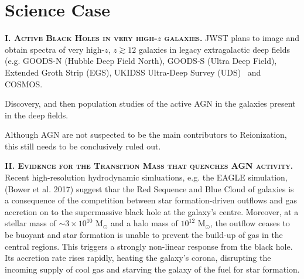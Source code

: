 \documentclass[11pt,epsf]{article}
\begin{document}
\newpage
\medskip
\medskip

\section*{Science Case}

\smallskip
\smallskip
\noindent
\textbf{\textsc{I. Active Black Holes in very high-$z$ galaxies.}} 
JWST plans to image and obtain spectra of very high-$z$, $z\gtrsim12$
galaxies in legacy extragalactic deep fields (e.g. GOODS-N (Hubble
Deep Field North), GOODS‐S (Ultra Deep Field), Extended Groth Strip
(EGS), UKIDSS Ultra-Deep Survey (UDS) \ and COSMOS.

\noindent
Discovery, and then population studies of the active AGN in the 
galaxies present in the deep fields. 

\noindent
Although AGN are not suspected to be the main contributors to 
Reionization, this still needs to be conclusively ruled out. 


\medskip
\medskip


\smallskip
\smallskip
\noindent
\textbf{\textsc{II. Evidence for the Transition Mass that quenches AGN activity.}} 
Recent high-resolution hydrodynamic simluations, e.g. the EAGLE
simulation, (Bower et al. 2017) suggest thar the Red Sequence and Blue
Cloud of galaxies is a consequence of the competition between star
formation-driven outflows and gas accretion on to the supermassive
black hole at the galaxy’s centre.  Moreover, at a stellar mass of
$\sim3{\times}10^{10}$ M$_{\odot}$ and a halo mass of $10^{12}$
M$_{\odot}$, the outflow ceases to be buoyant and star formation is
unable to prevent the build-up of gas in the central regions. This
triggers a strongly non-linear response from the black hole. Its
accretion rate rises rapidly, heating the galaxy’s corona, disrupting
the incoming supply of cool gas and starving the galaxy of the fuel
for star formation.


\medskip
\medskip
\end{document}
